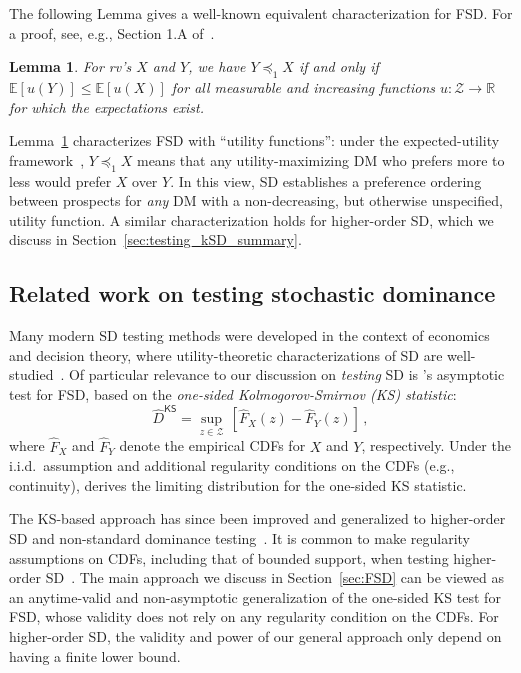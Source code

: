 \documentclass[12pt,twoside]{article}
\theoremstyle{plain}
\newtheorem{lemma}{Lemma}
\theoremstyle{definition}
\theoremstyle{remark}
\newcommand{\R}{\mathbb{R}}
\newcommand{\calZ}{\mathcal{Z}}
\newcommand{\Esymb}{\mathbb{E}}
\newcommand{\fsd}{\preceq_{1}}
\begin{document}
The following Lemma gives a well-known equivalent characterization for FSD. 
For a proof, see, e.g., Section 1.A of~\citet{shaked2007stochastic}. 
\begin{lemma}
\label{lem:FSD_equivalences}
For rv's $X$ and $Y$, we have $Y \fsd X$ if and only if $\Esymb[u(Y)] \leq \Esymb[u(X)]$ for all measurable and increasing functions $u:\calZ \to \R$ for which the expectations exist. 
\end{lemma}

Lemma~\ref{lem:FSD_equivalences} characterizes FSD with ``utility functions'': under the expected-utility framework~\citep{savage1951theory}, $Y \fsd X$ means that any utility-maximizing DM who prefers more to less would prefer $X$ over $Y$. 
In this view, SD establishes a preference ordering between prospects for \emph{any} DM with a non-decreasing, but otherwise unspecified, utility function. 
A similar characterization holds for higher-order SD, which we discuss in Section~\ref{sec:testing_kSD_summary}. 


\subsection{Related work on testing stochastic dominance}\label{sec:related_work_testing_SD}


Many modern SD testing methods were developed in the context of economics and decision theory, where utility-theoretic characterizations of SD are well-studied~\citep[e.g.,][]{fishburn1970utility,levy1992stochastic,mosler1993stochastic,muller2002comparison}. 
Of particular relevance to our discussion on \emph{testing} SD is \citet{mcfadden1989testing}'s asymptotic test for FSD, based on the \emph{one-sided Kolmogorov-Smirnov (KS) statistic}:
\begin{equation}\label{eqn:ks_stat}
    \hat{D}^\mathsf{KS} = \sup_{z \in \calZ}\, [\hat{F}_X(z) - \hat{F}_Y(z)]\,,
\end{equation}
where $\hat{F}_X$ and $\hat{F}_Y$ denote the empirical CDFs for $X$ and $Y$, respectively. 
Under the i.i.d.~assumption and additional regularity conditions on the CDFs (e.g., continuity), \citet{mcfadden1989testing} derives the limiting distribution for the one-sided KS statistic. 

The KS-based approach has since been improved and generalized to higher-order SD and non-standard dominance testing~\citep[e.g.,][]{kaur1994testing,abadie2002bootstrap,barrett2003consistent,donald2016improving,zhuang2024tests}.
It is common to make regularity assumptions on CDFs, including that of bounded support, when testing higher-order SD~\citep[e.g.,][]{barrett2003consistent,donald2016improving}. 
The main approach we discuss in Section~\ref{sec:FSD} can be viewed as an anytime-valid and non-asymptotic generalization of the one-sided KS test for FSD, whose validity does not rely on any regularity condition on the CDFs. 
For higher-order SD, the validity and power of our general approach only depend on having a finite lower bound. 
\end{document}
